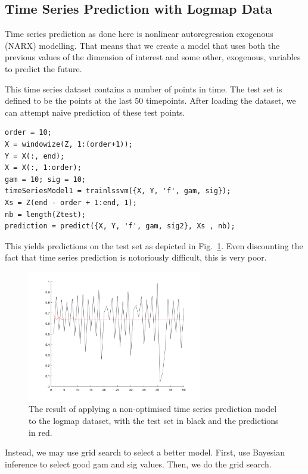 \documentclass[10pt,a4paper]{article}
\begin{document}
\subsection{Time Series Prediction with Logmap Data}
Time series prediction as done here is nonlinear autoregression exogenous (NARX) modelling. That means that we create a model that uses both the previous values of the dimension of interest and some other, exogenous, variables to predict the future.

This time series dataset contains a number of points in time. The test set is defined to be the points at the last 50 timepoints. After loading the dataset, we can attempt naive prediction of these test points.

\begin{lstlisting}[style=Matlab-editor, frame=single]
order = 10;
X = windowize(Z, 1:(order+1));
Y = X(:, end);
X = X(:, 1:order);
gam = 10; sig = 10;
timeSeriesModel1 = trainlssvm({X, Y, 'f', gam, sig});
Xs = Z(end - order + 1:end, 1);
nb = length(Ztest);
prediction = predict({X, Y, 'f', gam, sig2}, Xs , nb);
\end{lstlisting}

This yields predictions on the test set as depicted in Fig.~\ref{fig:logmapNaive}. Even discounting the fact that time series prediction is notoriously difficult, this is very poor.

\begin{figure}[h!]
\centering
  \includegraphics[width=3in]{logmapNaive.png}
  \caption{The result of applying a non-optimised time series prediction model to the logmap dataset, with the test set in black and the predictions in red.}
  \label{fig:logmapNaive}
\end{figure}
 
 Instead, we may use grid search to select a better model. First, use Bayesian inference to select good gam and sig values. Then, we do the grid search.
 
\end{document}
